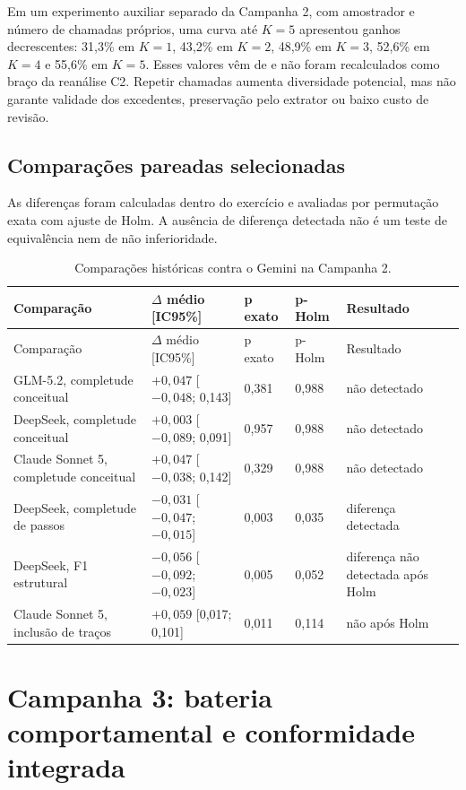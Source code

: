 \documentclass[11pt,a4paper]{article}
\begin{document}
Em um experimento auxiliar separado da Campanha 2, com amostrador e número de chamadas próprios, uma curva até $K=5$ apresentou ganhos decrescentes: 31,3\% em $K=1$, 43,2\% em $K=2$, 48,9\% em $K=3$, 52,6\% em $K=4$ e 55,6\% em $K=5$. Esses valores vêm de  e não foram recalculados como braço da reanálise C2. Repetir chamadas aumenta diversidade potencial, mas não garante validade dos excedentes, preservação pelo extrator ou baixo custo de revisão.

\subsection{Comparações pareadas selecionadas}

As diferenças foram calculadas dentro do exercício e avaliadas por permutação exata com ajuste de Holm. A ausência de diferença detectada não é um teste de equivalência nem de não inferioridade.

\begingroup
\small
\setlength{\tabcolsep}{3pt}
\begin{longtable}{@{}P{5.2cm}C{3.1cm}C{1.7cm}C{1.7cm}P{2.3cm}@{}}
\caption{Comparações históricas contra o Gemini na Campanha 2.}\label{tab:s-c2-tests}\\
\toprule
Comparação & $\Delta$ médio [IC95\%] & p exato & p-Holm & Resultado \\
\midrule
\endfirsthead
\toprule
Comparação & $\Delta$ médio [IC95\%] & p exato & p-Holm & Resultado \\
\midrule
\endhead
GLM-5.2, completude conceitual & $+0,047$ [$-0,048$; 0,143] & 0,381 & 0,988 & não detectado \\
DeepSeek, completude conceitual & $+0,003$ [$-0,089$; 0,091] & 0,957 & 0,988 & não detectado \\
Claude Sonnet 5, completude conceitual & $+0,047$ [$-0,038$; 0,142] & 0,329 & 0,988 & não detectado \\
DeepSeek, completude de passos & $-0,031$ [$-0,047$; $-0,015$] & 0,003 & 0,035 & diferença detectada \\
DeepSeek, F1 estrutural & $-0,056$ [$-0,092$; $-0,023$] & 0,005 & 0,052 & diferença não detectada após Holm \\
Claude Sonnet 5, inclusão de traços & $+0,059$ [0,017; 0,101] & 0,011 & 0,114 & não após Holm \\
\bottomrule
\end{longtable}
\endgroup

\section{Campanha 3: bateria comportamental e conformidade integrada}
\end{document}
